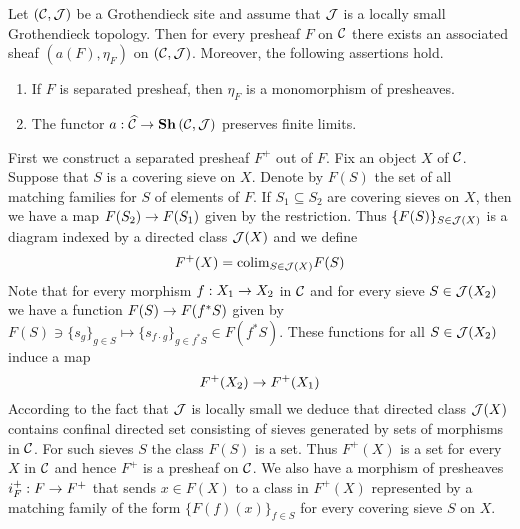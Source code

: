 \begin{theorem}\label{theorem:associatedsheaf}
Let $({\mathcal C},{\mathcal J})$ be a Grothendieck site and assume that ${\mathcal J}$ is a locally small Grothendieck topology. Then for every presheaf $F$ on ${\mathcal C}$ there exists an associated sheaf $\left(a(F),\eta_F\right)$ on $({\mathcal C},{\mathcal J})$. Moreover, the following assertions hold.
\begin{enumerate}[label=\emph{\textbf{(\arabic*)}}, leftmargin=1.5em]
\item If $F$ is separated presheaf, then $\eta_F$ is a monomorphism of presheaves.
\item The functor $a:\widehat{{\mathcal C}}\rightarrow \mathbf{Sh}\left({\mathcal C},{\mathcal J}\right)$ preserves finite limits.
\end{enumerate}
\end{theorem}
\noindent
First we construct a separated presheaf $F^+$ out of $F$. Fix an object $X$ of ${\mathcal C}$. Suppose that $S$ is a covering sieve on $X$. Denote by $F(S)$ the set of all matching families for $S$ of elements of $F$. If $S_1\subseteq S_2$ are covering sieves on $X$, then we have a map $F(S_2)\rightarrow F(S_1)$ given by the restriction. Thus $\{F(S)\}_{S\in {\mathcal J}(X)}$ is a diagram indexed by a directed class ${\mathcal J}(X)$ and we define
$$F^+(X)=\mathrm{colim}_{S\in {\mathcal J}(X)}F(S)$$
Note that for every morphism $f:X_1\rightarrow X_2$ in ${\mathcal C}$ and for every sieve $S\in {\mathcal J}(X_2)$ we have a function $F(S)\rightarrow F(f^*S)$ given by $F(S)\ni \{s_g\}_{g\in S}\mapsto \{s_{f\cdot g}\}_{g\in f^*S}\in F(f^*S)$. These functions for all $S\in {\mathcal J}(X_2)$ induce a map
$$F^+(X_2)\rightarrow F^+(X_1)$$
According to the fact that ${\mathcal J}$ is locally small we deduce that directed class ${\mathcal J}(X)$ contains confinal directed set consisting of sieves generated by sets of morphisms in ${\mathcal C}$. For such sieves $S$ the class $F(S)$ is a set. Thus $F^+(X)$ is a set for every $X$ in ${\mathcal C}$ and hence $F^+$ is a presheaf on ${\mathcal C}$. We also have a morphism of presheaves $i_F^+:F\rightarrow F^+$ that sends $x\in F(X)$ to a class in $F^+(X)$ represented by a matching family of the form $\{F(f)(x)\}_{f\in S}$ for every covering sieve $S$ on $X$.

